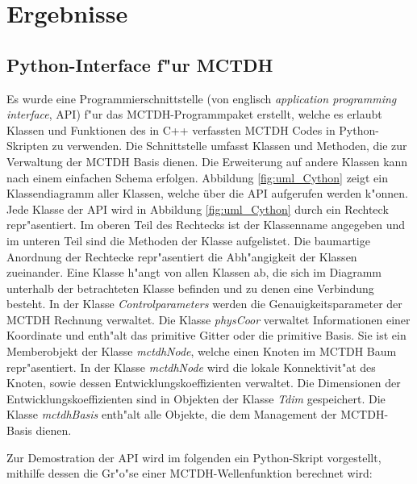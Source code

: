 \chapter{Ergebnisse}

\section{Python-Interface f"ur MCTDH}
\label{sec:PyInterface}

Es wurde eine Programmierschnittstelle (von englisch \textit{application programming interface}, API) f"ur das MCTDH-Programmpaket erstellt,
welche es erlaubt Klassen und Funktionen des in C++ verfassten MCTDH Codes in Python-Skripten zu verwenden.
Die Schnittstelle umfasst Klassen und Methoden, die zur Verwaltung der MCTDH Basis dienen.
Die Erweiterung auf andere Klassen kann nach einem einfachen Schema erfolgen.
Abbildung \ref{fig:uml_Cython} zeigt ein Klassendiagramm aller Klassen, welche über die API aufgerufen werden k"onnen.
Jede Klasse der API wird in Abbildung \ref{fig:uml_Cython} durch ein Rechteck repr"asentiert.
Im oberen Teil des Rechtecks ist der Klassenname angegeben und im unteren Teil sind die Methoden der Klasse aufgelistet.
Die baumartige Anordnung der Rechtecke repr"asentiert die Abh"angigkeit der Klassen zueinander. Eine Klasse h"angt von
allen Klassen ab, die sich im Diagramm unterhalb der betrachteten Klasse befinden und zu denen eine Verbindung besteht.
In der Klasse \textit{Controlparameters} werden die Genauigkeitsparameter der MCTDH Rechnung verwaltet. 
Die Klasse \textit{physCoor} verwaltet Informationen einer Koordinate und enth"alt das primitive Gitter oder
die primitive Basis. Sie ist ein Memberobjekt der Klasse \textit{mctdhNode}, welche einen Knoten im MCTDH Baum 
repr"asentiert. In der Klasse \textit{mctdhNode} wird die lokale Konnektivit"at des Knoten, sowie dessen
Entwicklungskoeffizienten verwaltet. Die Dimensionen der Entwicklungskoeffizienten sind in Objekten der Klasse
\textit{Tdim} gespeichert. Die Klasse \textit{mctdhBasis} enth"alt alle Objekte, die dem Management der MCTDH-Basis
dienen.

Zur Demostration der API wird im folgenden ein Python-Skript vorgestellt, mithilfe dessen die Gr"o"se einer
MCTDH-Wellenfunktion berechnet wird:

\newpage


